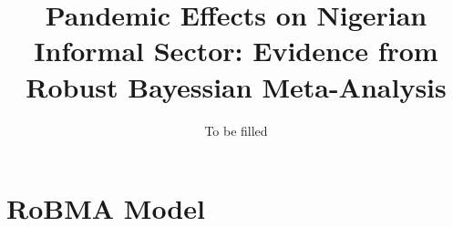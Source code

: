 \documentclass[12pt, article]{article}
\title{Pandemic Effects on Nigerian Informal Sector: Evidence from Robust Bayessian Meta-Analysis}
\author{To be filled}
\begin{document}
    \maketitle
    \newpage
    \tableofcontents


    \abstract
    \newpage


    \section{RoBMA Model}


    \newpage
    \printbibliography
\end{document}

